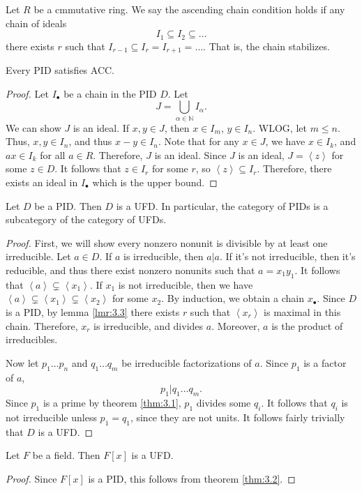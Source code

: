 \begin{definition}[ACC]\label{dfn:3.4}
	Let $R$ be a cmmutative ring. We say the ascending chain condition holds if any chain of ideals
	\[
		I_1 \subseteq I_2\subseteq \ldots 
	\]
	there exists $r$ such that $I_{r-1} \subseteq I_r=I_{r+1} =\ldots  $. That is, the chain stabilizes.
\end{definition}
\begin{lemma}\label{lma:3.3}
	Every PID satisfies ACC.
\end{lemma}
\begin{proof}
	Let $I_\bullet $ be a chain in the PID $D$.  Let
	\[
		J=\bigcup_{\alpha \in \mathbb{N} } I_\alpha 
	.\]
	We can show $J$ is an ideal. If $x,y\in J$, then $x\in I_m$, $y\in I_n$. WLOG, let $m\leq n$. Thus, $x,y\in I_n$,  and thus $x-y\in I_n$. Note that for any $x\in J$, we have $x\in I_k$, and $ax\in I_k$ for all $a\in R$. Therefore, $J$ is an ideal. Since $J$ is an ideal, $J=\left\langle z \right\rangle $ for some $z\in D$. It follows that $z\in I_r$ for some $r$, so $\left\langle z \right\rangle \subseteq I_r$. Therefore, there exists an ideal in $I_\bullet $ which is the upper bound.
\end{proof}
\begin{theorem}\label{thm:3.2}
	Let $D$ be a PID. Then $D$ is a UFD. In particular, the category of PIDs is a subcategory of the category of UFDs.
\end{theorem}
\begin{proof}
	First, we will show every nonzero nonunit is divisible by at least one irreducible. Let $a\in D$. If $a$ is irreducible, then $a|a$. If it's not irreducible, then it's reducible, and thus there exist nonzero nonunits such that $a=x_1y_1$. It follows that $\left\langle a \right\rangle \subsetneq \left\langle x_1 \right\rangle $. If $x_1$ is not irreducible, then we have $\left\langle a \right\rangle \subsetneq \left\langle x_1 \right\rangle \subsetneq \left\langle x_2 \right\rangle $ for some $x_2$. By induction, we obtain a chain $x_\bullet $. Since $D$ is a PID, by lemma \ref{lmr:3.3} there exists $r$ such that $\left\langle x_r \right\rangle $ is maximal in this chain. Therefore, $x_r$ is irreducible, and divides $a$. Moreover, $a$ is the product of irreducibles.

	Now let $p_1\ldots p_n$ and $q_1\ldots q_m$ be irreducible factorizations of $a$. Since $p_1$ is a factor of $a$,
	\[
		p_1|q_1\ldots q_m
	.\]
	Since $p_1$ is a prime by theorem \ref{thm:3.1}, $p_1$ divides some $q_i$. It follows that $q_i$ is not irreducible unless $p_1=q_1$, since they are not units. It follows fairly trivially that $D$ is a UFD.
\end{proof}
\begin{corollary}\label{cor:3.3}
	Let $F$ be a field. Then $F[x]$ is a UFD.
\end{corollary}
\begin{proof}
	Since $F[x]$ is a PID, this follows from theorem \ref{thm:3.2}.
\end{proof}

